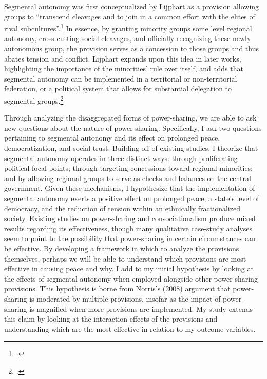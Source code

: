 \documentclass[12pt]{article}
\begin{document}
Segmental autonomy was first conceptualized by Lijphart as a provision allowing groups to ``transcend cleavages and to join in a common effort with the elites of rival subcultures''.\footcite[216]{lijphart_consociational_1969} In essence, by granting minority groups some level regional autonomy, cross-cutting social cleavages, and officially recognizing these newly autonomous group, the provision serves as a concession to those groups and thus abates tension and conflict. Lijphart expands upon this idea in later works, highlighting the importance of the minorities’ rule over itself, and adds that segmental autonomy can be implemented in a territorial or non-territorial federation, or a political system that allows for substantial delegation to segmental groups.\footcite{lijphart_consociational_1977, lijphart_non-majoritarian_1985} 

Through analyzing the disaggregated forms of power-sharing, we are able to ask new questions about the nature of power-sharing. Specifically, I ask two questions pertaining to segmental autonomy and its effect on prolonged peace, democratization, and social trust. Building off of existing studies, I theorize that segmental autonomy operates in three distinct ways: through proliferating political focal points; through targeting concessions toward regional minorities; and by allowing regional groups to serve as checks and balances on the central government. Given these mechanisms, I hypothesize that the implementation of segmental autonomy exerts a positive effect on prolonged peace, a state’s level of democracy, and the reduction of tension within an ethnically fractionalized society. Existing studies on power-sharing and consociationalism produce mixed results regarding its effectiveness, though many qualitative case-study analyses seem to point to the possibility that power-sharing in certain circumstances can be effective. By developing a framework in which to analyze the provisions themselves, perhaps we will be able to understand which provisions are most effective in causing peace and why. I add to my initial hypothesis by looking at the effects of segmental autonomy when employed alongside other power-sharing provisions. This hypothesis is borne from Norris’s (2008) argument that power-sharing is moderated by multiple provisions, insofar as the impact of power-sharing is magnified when more provisions are implemented. My study extends this claim by looking at the interaction effects of the provisions and understanding which are the most effective in relation to my outcome variables.
\end{document}
